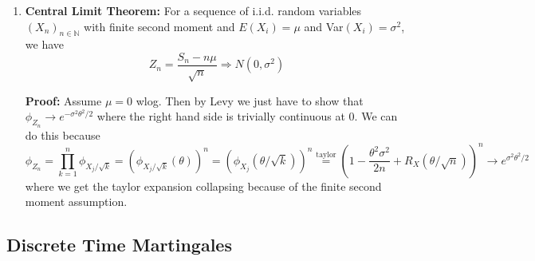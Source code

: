 \documentclass{article}
\begin{document}
\begin{enumerate}
    \item \textbf{Central Limit Theorem:} For a sequence of i.i.d. random variables \((X_n)_{n \in \mathbb{N}}\) with finite second moment and \(E(X_i) = \mu\) and Var\((X_i) = \sigma^2\), we have
    \[
    Z_n = \frac{S_n - n\mu}{\sqrt{n}} \Rightarrow N(0, \sigma^2)
    \] 

    \textbf{Proof:} Assume \(\mu = 0\) wlog. Then by Levy we just have to show that \(\phi_{Z_n} \to e^{-\sigma^2\theta^2/2}\) where the right hand side is trivially continuous at 0. We can do this because
    \[
    \phi_{Z_n} = \prod_{k=1}^{n} \phi_{X_j/\sqrt{k}} = \left(\phi_{X_j/\sqrt{k}}(\theta)\right)^n = \left(\phi_{X_j}(\theta/\sqrt{k})\right)^n \overset{\text{taylor}}{= }\left(1 -\frac{\theta^2\sigma^2}{2n} + R_X(\theta/\sqrt{n})\right)^n \to e^{\sigma^2\theta^2/2}
    \]
    where we get the taylor expansion collapsing because of the finite second moment assumption.
\end{enumerate}

\subsection*{Discrete Time Martingales}
\end{document}
